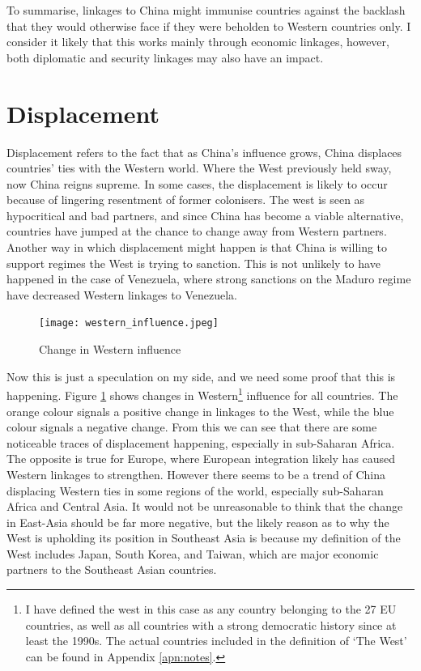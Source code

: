 To summarise, linkages to China might immunise countries against the backlash that they would otherwise face if they were beholden to Western countries only. I consider it likely that this works mainly through economic linkages, however, both diplomatic and security linkages may also have an impact.

\section{Displacement}
Displacement refers to the fact that as China's influence grows, China displaces countries' ties with the Western world. Where the West previously held sway, now China reigns supreme. In some cases, the displacement is likely to occur because of lingering resentment of former colonisers. The west is seen as hypocritical and bad partners, and since China has become a viable alternative, countries have jumped at the chance to change away from Western partners. Another way in which displacement might happen is that China is willing to support regimes the West is trying to sanction. This is not unlikely to have happened in the case of Venezuela, where strong sanctions on the Maduro regime have decreased Western linkages to Venezuela.

\begin{figure}[hbt!]
\centering
\texttt{[image: western\_influence.jpeg]}
\caption{Change in Western influence}
\label{fig:west}
\end{figure}

Now this is just a speculation on my side, and we need some proof that this is happening. Figure  \ref{fig:west} shows changes in Western\footnote{I have defined the west in this case as any country belonging to the 27 EU countries, as well as all countries with a strong democratic history since at least the 1990s. The actual countries included in the definition of `The West' can be found in Appendix \ref{apn:notes}.} influence for all countries. The orange colour signals a positive change in linkages to the West, while the blue colour signals a negative change. From this we can see that there are some noticeable traces of displacement happening, especially in sub-Saharan Africa. The opposite is true for Europe, where European integration likely has caused Western linkages to strengthen. However there seems to be a trend of China displacing Western ties in some regions of the world, especially sub-Saharan Africa and Central Asia. It would not be unreasonable to think that the change in East-Asia should be far more negative, but the likely reason as to why the West is upholding its position in Southeast Asia is because my definition of the West includes Japan, South Korea, and Taiwan, which are major economic partners to the Southeast Asian countries. 

